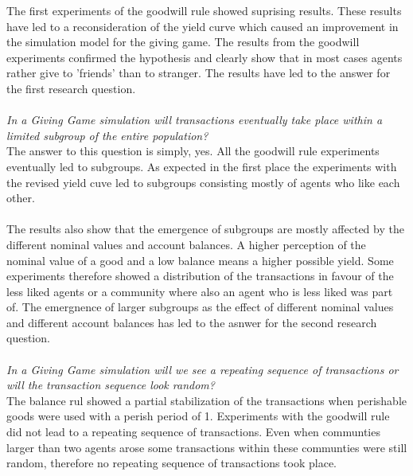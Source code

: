 \documentclass[twoside,openright]{uva-bachelor-thesis}
\begin{document}
The first experiments of the goodwill rule showed suprising results. These results have led to a reconsideration of the yield curve which caused an improvement in the simulation model for the giving game. The results from the goodwill experiments confirmed the hypothesis and clearly show that in most cases agents rather give to 'friends' than to stranger. The results have led to the answer for the first research question. \\ 
\\
\textit{In a Giving Game simulation will transactions eventually take place within a limited subgroup of the entire population?} \\
The answer to this question is simply, yes. All the goodwill rule experiments eventually led to subgroups. As expected in the first place the experiments with the revised yield cuve led to subgroups consisting mostly of agents who like each other. 
\\
\\
The results also show that the emergence of subgroups are mostly affected by the different nominal values and account balances. A higher perception of the nominal value of a good and a low balance means a higher possible yield. Some experiments therefore showed a distribution of the transactions in favour of the less liked agents or a community where also an agent who is less liked was part of. The emergnence of larger subgroups as the effect of different nominal values and different account balances has led to the asnwer for the second research question.
\\
\\
\textit{In a Giving Game simulation will we see a repeating sequence of transactions or will the transaction sequence look random?} \\
The balance rul showed a partial stabilization of the transactions when perishable goods were used with a perish period of 1. Experiments with the goodwill rule did not lead to a repeating sequence of transactions. Even when communties larger than two agents arose some transactions within these communties were still random, therefore no repeating sequence of transactions took place.
\end{document}
